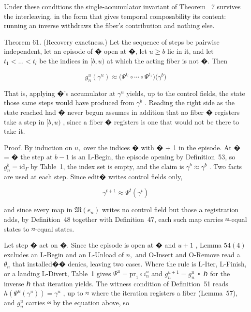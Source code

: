 \documentclass[
  10
]{article}
\begin{document}
Under these conditions the single-accumulator invariant of Theorem~ 7
survives the interleaving, in the form that gives temporal composability
its content: running an inverse withdraws the fiber's contribution and
nothing else.

Theorem 61. (Recovery exactness.) Let the sequence of steps be pairwise
independent, let an episode of � open at �, let \(u \geq b\) lie in it,
and let \(t _ { 1 } < \dots < t _ { l }\) be the indices in
\([ b , u )\) at which the acting fiber is not �. Then

\[
g _ { n } ^ { u } ( \gamma ^ { u } ) \approx \big ( \Psi ^ { t _ { l } } \circ \dotsb \circ \Psi ^ { t _ { 1 } } \big ) \big ( \gamma ^ { b } \big )\tag{56}
\]

That is, applying �'s accumulator at \(\gamma ^ { u }\) yields, up to
the control fields, the state those same steps would have produced from
\(\gamma ^ { b }\) . Reading the right side as the state reached had �
never begun assumes in addition that no fiber � registers take a step in
\([ b , u )\) , since a fiber � registers is one that would not be there
to take it.

Proof. By induction on \(u ,\) over the indices � with � + 1 in the
episode. At � = � the step at \(b - 1\) is an L-Begin, the episode
opening by Definition~53, so
\(g _ { n } ^ { b } = \mathrm { i d } _ { \Gamma }\) by Table~1, the
index set is empty, and the claim is
\(\bar { \gamma } ^ { b } \approx \gamma ^ { b }\) . Two facts are used
at each step. Since edit� writes control fields only,

\[
\gamma ^ { t + 1 } \approx \Psi ^ { t } ( \gamma ^ { t } )
\]

and since every map in \({ \mathfrak { M } } ( e _ { n } )\) writes no
control field but those a registration adds, by Definition~48 together
with Definition~47, each such map carries ≈-equal states to ≈-equal
states.

Let step � act on �. Since the episode is open at � and \(u + 1\) ,
Lemma \(5 4 ( 4 )\) excludes an L-Begin and an L-Unload of \(n ,\) and
O-Insert and O-Remove read a \(\theta _ { n }\) that installed�� denies,
leaving two cases. Where the rule is L-Iter, L-Finish, or a landing
L-Divert, Table~1 gives
\(\Psi ^ { u } = \mathrm { p r } _ { 1 } \circ i _ { n } ^ { u }\) and
\(g _ { n } ^ { u + 1 } = g _ { n } ^ { u }\) ∘ ℎ for the inverse ℎ that
iteration yields. The witness condition of Definition~51 reads
\(h ( \Psi ^ { u } ( \gamma ^ { u } ) ) = \gamma ^ { u }\) , up to ≈
where the iteration registers a fiber (Lemma~57), and
\(g _ { n } ^ { u }\) carries ≈ by the equation above, so
\end{document}
